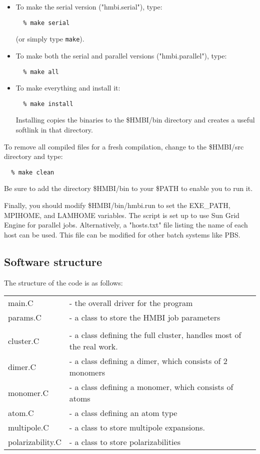 \documentclass[11pt,letterpaper]{article}
\begin{document}
\begin{spacing}{1.0}
\begin{itemize}
\item To make the serial version ("hmbi.serial"), type:
\begin{verbatim}
  % make serial
\end{verbatim}
(or simply type {\tt make}).  
\item To make both the serial and parallel versions ("hmbi.parallel"), type:
\begin{verbatim}
  % make all
\end{verbatim}
\item To make everything and install it:
\begin{verbatim}
  % make install 
\end{verbatim}
Installing copies the binaries to the \$HMBI/bin directory and creates
a useful softlink in that directory.  
\end{itemize}

To remove all compiled files for a fresh compilation, change to the \$HMBI/src
directory and type:
\begin{verbatim}
  % make clean
\end{verbatim}

Be sure to add the directory \$HMBI/bin to your \$PATH to enable you to run it.

Finally, you should modify \$HMBI/bin/hmbi.run to set the EXE\_PATH, MPIHOME, 
and LAMHOME variables.  The script is set up to use Sun Grid Engine for
parallel jobs.  Alternatively, a "hosts.txt" file listing the name of each
host can be used.  This file can be modified for other batch systems like
PBS.  


\subsection{Software structure}

The structure of the code is as follows:

\vspace{3mm}

\begin{tabular}{ll}
main.C		&- the overall driver for the program \\
params.C	&- a class to store the HMBI job parameters \\
\\
cluster.C	&- a class defining the full cluster, handles most of the real work. \\
dimer.C		&- a class defining a dimer, which consists of 2 monomers \\
monomer.C	&- a class defining a monomer, which consists of atoms \\
atom.C		&- a class defining an atom type \\
multipole.C     &- a class to store multipole expansions. \\
polarizability.C &- a class to store polarizabilities \\


\end{tabular}
\end{spacing}
\end{document}
